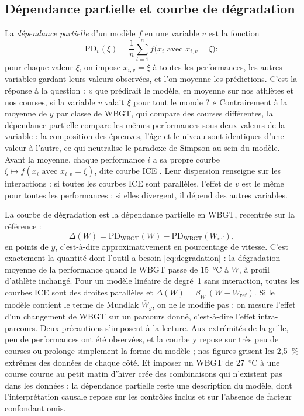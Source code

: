 \documentclass[11pt,a4paper]{article}
\newcommand{\WBGT}{\mathrm{WBGT}}
\begin{document}
\subsection{Dépendance partielle et courbe de dégradation}\label{sec:pd}

La \emph{dépendance partielle} d'un modèle $f$ en une variable $v$ \citep{friedman2001} est la fonction
\[
\mathrm{PD}_v(\xi) = \frac1n\sum_{i=1}^n f\big(x_i \text{ avec } x_{i,v} = \xi\big) :
\]
pour chaque valeur $\xi$, on impose $x_{i,v} = \xi$ à toutes les performances, les autres variables gardant leurs
valeurs observées, et l'on moyenne les prédictions. C'est la réponse à la question : « que prédirait le modèle, en
moyenne sur nos athlètes et nos courses, si la variable $v$ valait $\xi$ pour tout le monde ? » Contrairement à la
moyenne de $y$ par classe de WBGT, qui compare des courses différentes, la dépendance partielle compare les mêmes
performances sous deux valeurs de la variable : la composition des épreuves, l'âge et le niveau sont identiques d'une
valeur à l'autre, ce qui neutralise le paradoxe de Simpson au sein du modèle. Avant la moyenne, chaque performance
$i$ a sa propre courbe $\xi \mapsto f(x_i \text{ avec } x_{i,v} = \xi)$, dite courbe ICE \citep{goldstein2015}. Leur
dispersion renseigne sur les interactions : si toutes les courbes ICE sont parallèles, l'effet de $v$ est le même pour
toutes les performances ; si elles divergent, il dépend des autres variables.

La courbe de dégradation est la dépendance partielle en WBGT, recentrée sur la référence :
\begin{equation}\label{eq:courbe_degradation}
\Delta(W) = \mathrm{PD}_{\WBGT}(W) - \mathrm{PD}_{\WBGT}(W_{\text{ref}}),
\end{equation}
en points de $y$, c'est-à-dire approximativement en pourcentage de vitesse. C'est exactement la quantité dont l'outil
a besoin \eqref{eq:degradation} : la dégradation moyenne de la performance quand le WBGT passe de 15~°C à $W$, à profil
d'athlète inchangé. Pour un modèle linéaire de degré~1 sans interaction, toutes les courbes ICE sont des droites
parallèles et $\Delta(W) = \beta_W\,(W - W_{\text{ref}})$. Si le modèle contient le terme de Mundlak $\bar W_g$, on ne
le modifie pas : on mesure l'effet d'un changement de WBGT sur un parcours donné, c'est-à-dire l'effet intra-parcours.
Deux précautions s'imposent à la lecture. Aux extrémités de la grille, peu de performances ont été observées, et la
courbe y repose sur très peu de courses ou prolonge simplement la forme du modèle ; nos figures grisent les 2,5~\%
extrêmes des données de chaque côté. Et imposer un WBGT de 27~°C à une course courue au petit matin d'hiver crée des
combinaisons qui n'existent pas dans les données : la dépendance partielle reste une description du modèle, dont
l'interprétation causale repose sur les contrôles inclus et sur l'absence de facteur confondant omis.
\end{document}
